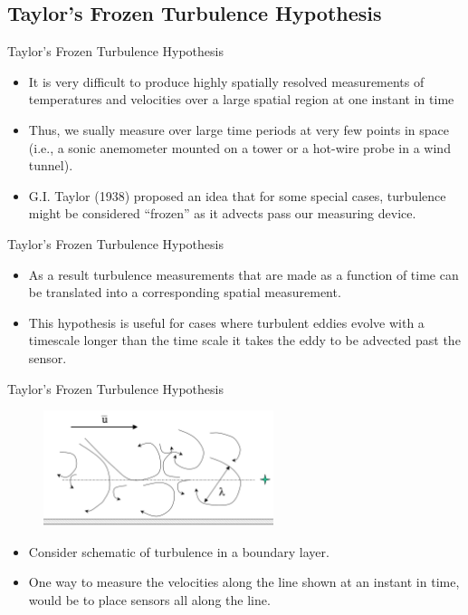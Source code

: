 \subsection{Taylor's Frozen Turbulence Hypothesis}
\begin{frame}{Taylor's Frozen Turbulence Hypothesis}

\begin{itemize}
	\item It is very difficult to produce highly spatially resolved measurements of temperatures and velocities over a large spatial region at one instant in time
	\item Thus, we sually measure over large time periods at very few points in space (i.e., a sonic anemometer mounted on a tower or a hot-wire probe in a wind tunnel). 
	\item G.I. Taylor (1938) proposed an idea that for some special cases, turbulence might be considered ``frozen'' as it advects pass our measuring device. 
\end{itemize}
\end{frame}


\begin{frame}{Taylor's Frozen Turbulence Hypothesis}

\begin{itemize}
	\item As a result turbulence measurements that are made as a function of time can be translated into a corresponding spatial measurement.
	\item  This hypothesis is useful for cases where turbulent eddies evolve with a timescale longer than the time scale it takes the eddy to be advected past the sensor.
\end{itemize}
\end{frame}


\begin{frame}{Taylor's Frozen Turbulence Hypothesis}
\begin{figure}
	\includegraphics[width=0.6\textwidth]{frozen.png}
\end{figure}
\begin{itemize}
	\item Consider schematic of turbulence in a boundary layer. 
	\item One way to measure the velocities along the line shown at an instant in time, would be to place sensors all along the line.
\end{itemize}
\end{frame}

